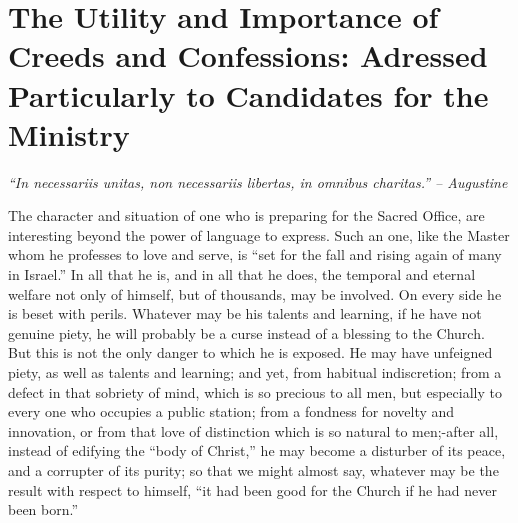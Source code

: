 \documentclass[
]{book}
\begin{document}
\clearpage
\setcounter{page}{1}

\hypertarget{the-utility-and-importance-of-creeds-and-confessions-adressed-particularly-to-candidates-for-the-ministry}{%
\chapter*{The Utility and Importance of Creeds and Confessions: Adressed Particularly to Candidates for the Ministry}\label{the-utility-and-importance-of-creeds-and-confessions-adressed-particularly-to-candidates-for-the-ministry}}

\emph{``In necessariis unitas, non necessariis libertas, in omnibus charitas.'' -- Augustine}

The character and situation of one who is preparing for the Sacred Office, are interesting beyond the power of language to express. Such an one, like the Master whom he professes to love and serve, is ``set for the fall and rising again of many in Israel.'' In all that he is, and in all that he does, the temporal and eternal welfare not only of himself, but of thousands, may be involved. On every side he is beset with perils. Whatever may be his talents and learning, if he have not genuine piety, he will probably be a curse instead of a blessing to the Church. But this is not the only danger to which he is exposed. He may have unfeigned piety, as well as talents and learning; and yet, from habitual indiscretion; from a defect in that sobriety of mind, which is so precious to all men, but especially to every one who occupies a public station; from a fondness for novelty and innovation, or from that love of distinction which is so natural to men;-after all, instead of edifying the ``body of Christ,'' he may become a disturber of its peace, and a corrupter of its purity; so that we might almost say, whatever may be the result with respect to himself, ``it had been good for the Church if he had never been born.''
\end{document}
